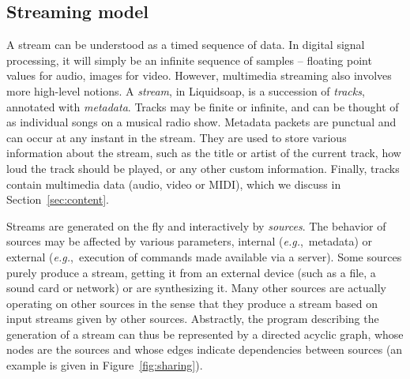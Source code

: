 \documentclass{llncs}
\newcommand{\liquidsoap}{Liquidsoap}
\newcommand{\eg}{\emph{e.g.},}
\newcommand{\fcaption}[1]{\vspace{-3ex}\caption{#1}\vspace{-4ex}}
\begin{document}
\subsection{Streaming model}
\label{sec:model}
A stream can be understood as a timed sequence of data.
In digital signal processing, it will simply be an infinite sequence of 
samples -- floating point values for audio, images for video.
However, multimedia streaming also involves more high-level notions.
A \emph{stream}, in \liquidsoap{}, is a succession of \emph{tracks}, annotated
with \textit{metadata}. Tracks may be finite or infinite, and can be thought
of as individual songs on a musical radio show. 
Metadata packets are punctual and can occur at any instant in the
stream. They are used to store various information about the
stream, such as the title or artist of the current track,
how loud the track should be played,
or any other custom information.
Finally, tracks contain multimedia data (audio, video or MIDI),
which we discuss in Section~\ref{sec:content}.

Streams are generated on the fly and interactively by \emph{sources}.
The behavior of sources may be affected by various parameters,
internal (\eg\ metadata) or external (\eg\ execution of commands
made available via a server).
Some sources
purely produce a stream, getting it from an external device (such as a file, a
sound card or network) or are synthesizing it.
Many other sources are actually operating on other sources in the sense that
they produce a stream based on input streams given by other sources.
Abstractly, the program describing the
generation of a stream can thus be represented by a directed acyclic graph,
whose nodes are the sources and whose edges indicate dependencies between
sources (an example is given in Figure~\ref{fig:sharing}).

\end{document}
